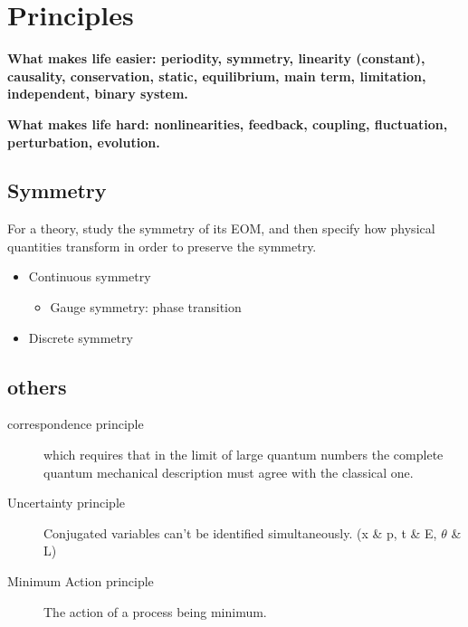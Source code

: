 \section{Principles}
\textbf{What makes life easier: periodity, symmetry, linearity (constant), causality, conservation, static, equilibrium, main term, limitation, independent, binary system.}

\textbf{What makes life hard: nonlinearities, feedback, coupling, 
fluctuation, perturbation, evolution.}

\subsection{Symmetry}
For a theory, study the symmetry of its EOM, and then specify how physical quantities transform in order to preserve the symmetry.
\begin{itemize}
    \item Continuous symmetry
	\begin{itemize}
	    \item Gauge symmetry: phase transition
	\end{itemize}
    \item Discrete symmetry
\end{itemize}




\subsection{others}
\begin{description}
    \item[correspondence principle]
	which requires that in the limit of large quantum numbers the 
	complete quantum mechanical description must agree with the 
	classical one.
    \item[Uncertainty principle]
	Conjugated variables can't be identified simultaneously. (x \& p, t \& E, $\theta$ \& L)
    \item[Minimum Action principle]
	The action of a process being minimum.
\end{description}
